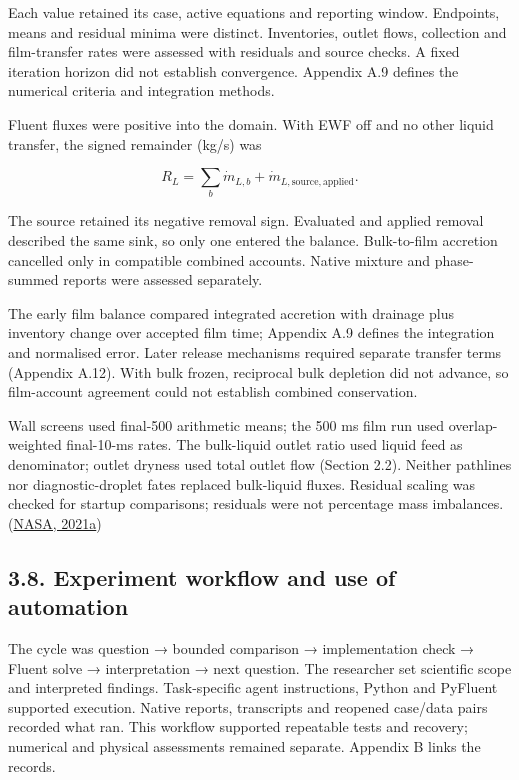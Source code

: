 \documentclass[
  12pt,
  a4paper,
]{article}
\begin{document}
Each value retained its case, active equations and reporting window.
Endpoints, means and residual minima were distinct. Inventories, outlet
flows, collection and film-transfer rates were assessed with residuals
and source checks. A fixed iteration horizon did not establish
convergence. Appendix A.9 defines the numerical criteria and integration
methods.

Fluent fluxes were positive into the domain. With EWF off and no other
liquid transfer, the signed remainder (kg/s) was

\[
R_L=\sum_b\dot m_{L,b}+\dot m_{L,\mathrm{source,applied}}.
\]

The source retained its negative removal sign. Evaluated and applied
removal described the same sink, so only one entered the balance.
Bulk-to-film accretion cancelled only in compatible combined accounts.
Native mixture and phase-summed reports were assessed separately.

The early film balance compared integrated accretion with drainage plus
inventory change over accepted film time; Appendix A.9 defines the
integration and normalised error. Later release mechanisms required
separate transfer terms (Appendix A.12). With bulk frozen, reciprocal
bulk depletion did not advance, so film-account agreement could not
establish combined conservation.

Wall screens used final-500 arithmetic means; the 500 ms film run used
overlap-weighted final-10-ms rates. The bulk-liquid outlet ratio used
liquid feed as denominator; outlet dryness used total outlet flow
(Section 2.2). Neither pathlines nor diagnostic-droplet fates replaced
bulk-liquid fluxes. Residual scaling was checked for startup
comparisons; residuals were not percentage mass imbalances.
(\href{https://www.grc.nasa.gov/www/wind/valid/tutorial/iterconv.html}{NASA,
2021a})

\subsection{3.8. Experiment workflow and use of
automation}\label{experiment-workflow-and-use-of-automation}

The cycle was question → bounded comparison → implementation check →
Fluent solve → interpretation → next question. The researcher set
scientific scope and interpreted findings. Task-specific agent
instructions, Python and PyFluent supported execution. Native reports,
transcripts and reopened case/data pairs recorded what ran. This
workflow supported repeatable tests and recovery; numerical and physical
assessments remained separate. Appendix B links the records.
\end{document}
